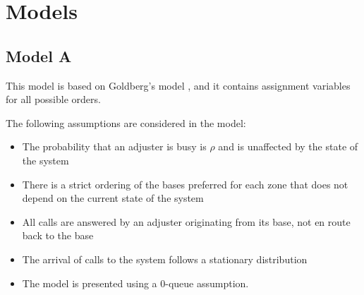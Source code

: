 
\section{Models}
\subsection{Model A}

\begin{frame}
  This model is based on Goldberg's model \cite{goldberg1990validating}, and it contains assignment
  variables for all possible orders.

  The following assumptions are considered in the model:
  \begin{itemize}
  \item The probability that an adjuster is busy is $\rho$
    and is unaffected by the state of the system
  \item There is a strict ordering of the bases preferred for each zone
    that does not depend on the current state of the system
  \item All calls are answered by an adjuster originating from its base,
    not en route back to the base
  \item The arrival of calls to the system follows a stationary distribution
  \item The model is presented using a 0-queue assumption.
  \end{itemize}
  
\end{frame}


